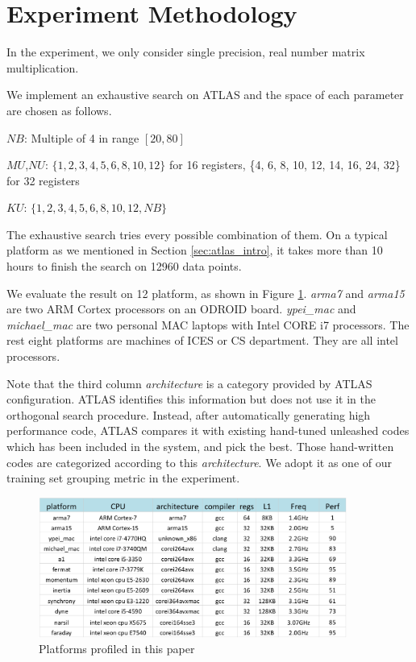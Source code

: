 \section{Experiment Methodology}
\label{sec:experiment}

In the experiment, we only consider single precision, real number matrix multiplication. 
\par
We implement an exhaustive search on ATLAS and the space of each parameter are chosen as follows.\par
$NB$: Multiple of 4 in range $[20, 80]$\par
$MU$,$NU$: $\{1, 2, 3, 4, 5, 6, 8, 10, 12\}$ for 16 registers,
		\{4, 6, 8, 10, 12, 14, 16, 24, 32\} for 32 registers\par
$KU$: $\{1, 2, 3, 4, 5, 6, 8, 10, 12, NB\}$\par
The exhaustive search tries every possible combination of them. 
On a typical platform as we mentioned in Section \ref{sec:atlas_intro}, it takes more than 10 hours to finish 
the search on 12960 data points.\par

We evaluate the result on 12 platform, as shown in Figure \ref{fig:platforms}. \textit{arma7} and \textit{arma15}
are two ARM Cortex processors on an ODROID board. 
\textit{ypei\_mac} and \textit{michael\_mac} are two personal MAC laptops 
with Intel CORE i7 processors. The rest eight platforms are machines of ICES or CS department. They are all intel processors.\par

Note that the third column \textit{architecture} is a category provided by ATLAS configuration. 
ATLAS identifies this information but does not use it in the orthogonal search procedure. Instead, after automatically 
generating high performance code, ATLAS compares it with existing hand-tuned unleashed codes which has been included in the system, 
and pick the best. Those hand-written codes are categorized according to this \textit{architecture}. 
We adopt it as one of our training set grouping metric in the experiment.\par



\begin{figure}[tbhp]
  \centering
  \includegraphics[width=0.9\textwidth]{images/platforms.png}
  \caption{Platforms profiled in this paper}
  \label{fig:platforms}
\end{figure}


